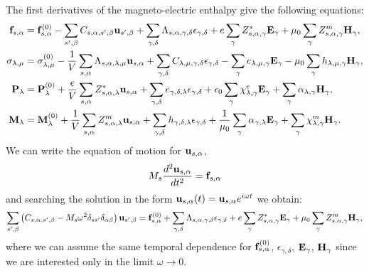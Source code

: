 \documentclass[12pt,a4paper,twoside]{report}
\begin{document}
The first derivatives of the magneto-electric enthalpy give the following equations:
\begin{align}
{\bf f}_{s,\alpha}&= {\bf f}^{(0)}_{s,\alpha}
-\sum_{s',\beta} C_{s,\alpha,s',\beta} {\bf u}_{s',\beta}
+\sum_{\gamma,\delta}
\Lambda_{s,\alpha,\gamma,\delta} 
\epsilon_{\gamma,\delta} +
e \sum_{\gamma} Z^*_{s,\alpha,\gamma} {\bf E}_{\gamma}
+\mu_0 \sum_{\gamma} 
Z^m_{s,\alpha,\gamma} {\bf H}_{\gamma}, \\
\sigma_{\lambda,\mu}&= \sigma_{\lambda,\mu}^{(0)}
-{1\over V} \sum_{s,\alpha}
\Lambda_{s,\alpha,\lambda,\mu} {\bf u}_{s,\alpha}
+\sum_{\gamma,\delta} C_{\lambda,\mu,\gamma,\delta}  
\epsilon_{\gamma,\delta} -
\sum_{\gamma} e_{\lambda,\mu,\gamma} 
 {\bf E}_{\gamma}
-\mu_0 \sum_{\gamma}  h_{\lambda,\mu,\gamma} 
{\bf H}_{\gamma}, \\
{\bf P}_{\lambda}&= {\bf P}^{(0)}_{\lambda}
+{e\over V} \sum_{s,\alpha} Z^*_{s,\alpha,\lambda} 
{\bf u}_{s,\alpha} +
\sum_{\gamma,\delta} e_{\gamma,\delta,\lambda} 
\epsilon_{\gamma,\delta} +
\epsilon_0 \sum_{\gamma} 
\chi^e_{\lambda,\gamma}
{\bf E}_{\gamma} +
\sum_{\gamma} \alpha_{\lambda,\gamma} 
{\bf H}_{\gamma}, \\
{\bf M}_{\lambda}&= {\bf M}^{(0)}_{\lambda}
+{1\over V}\sum_{s,\alpha} 
Z^m_{s,\alpha,\lambda} {\bf u}_{s,\alpha} +
\sum_{\gamma,\delta}  h_{\gamma,\delta,\lambda} 
\epsilon_{\gamma,\delta} 
+{1\over \mu_0} \sum_{\gamma} \alpha_{\gamma,\lambda} {\bf E}_{\gamma}
+\sum_{\gamma} 
\chi^m_{\lambda,\gamma}
{\bf H}_{\gamma}.
\end{align}
We can write the equation of motion for ${\bf u}_{s,\alpha}$, 
\begin{equation}
M_s {d^2 {\bf u}_{s,\alpha} \over d t^2} = {\bf f}_{s,\alpha}
\end{equation}
and searching the solution in the form ${\bf u}_{s,\alpha}(t)=
{\bf u}_{s,\alpha} e^{i\omega t}$ we obtain:
\begin{equation}
\sum_{s',\beta} \left(C_{s,\alpha,s',\beta} - 
M_s \omega^2 \delta_{ss'}\delta_{\alpha\beta}\right)
{\bf u}_{s',\beta}= {\bf f}^{(0)}_{s,\alpha} + \sum_{\gamma,\delta} 
\Lambda_{s,\alpha,\gamma,\delta} \epsilon_{\gamma,\delta}
+ e \sum_{\gamma} Z^*_{s,\alpha,\gamma} {\bf E}_{\gamma} 
+ \mu_0 \sum_{\gamma} Z^m_{s,\alpha,\gamma} 
{\bf H}_{\gamma},
\end{equation}
where we can assume the same temporal dependence for 
${\bf f}^{(0)}_{s,\alpha}$, $\epsilon_{\gamma,\delta}$,
${\bf E}_{\gamma}$,
${\bf H}_{\gamma}$ since we are interested only in the limit 
$\omega \rightarrow 0$.
\end{document}
